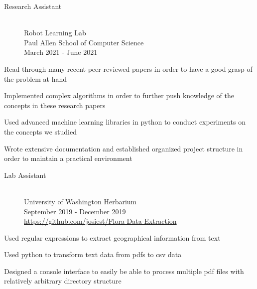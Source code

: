 \documentclass[10pt]{article}
\newenvironment{itemize*}
{\begin{itemize}[leftmargin=*]
    \setlength{\parskip}{0.5pt}}
{\end{itemize}}
\begin{document}
\begin{paracol}{2}
\begin{description}
\item[Research Assistant] \hfill \\
    Robot Learning Lab \\
    Paul Allen School of Computer Science \\
    March 2021 - June 2021
\end{description}
\begin{itemize*}
\item Read through many recent peer-reviewed papers in order to have a good
      grasp of the problem at hand
\item Implemented complex algorithms in order to further push knowledge of the
      concepts in these research papers
\item Used advanced machine learning libraries in python to conduct experiments
      on the concepts we studied
\item Wrote extensive documentation and established organized project structure
      in order to maintain a practical environment
\end{itemize*}

\begin{description}
\item[Lab Assistant] \hfill \\
    University of Washington Herbarium\\
    September 2019 - December 2019\\
    \url{https://github.com/josiest/Flora-Data-Extraction}
\end{description}
\begin{itemize*}
\item Used regular expressions to extract geographical information from text
\item Used python to transform text data from pdfs to csv data
\item Designed a console interface to easily be able to process multiple pdf
      files with relatively arbitrary directory structure
\end{itemize*}

\end{paracol}
\end{document}
